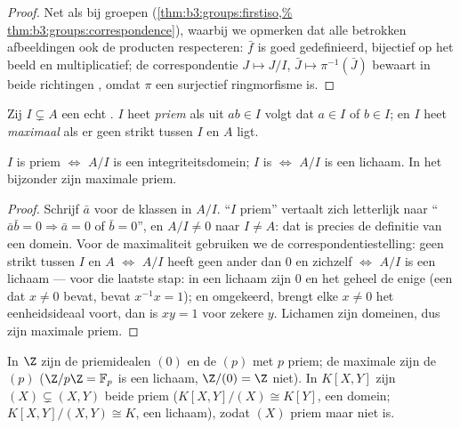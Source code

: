 \begin{proof}
Net als bij groepen (\cref{thm:b3:groups:firstiso,%
thm:b3:groups:correspondence}), waarbij we opmerken dat alle
betrokken afbeeldingen ook de producten respecteren: $\bar f$ is
goed gedefinieerd, bijectief op het beeld en multiplicatief; de
correspondentie $J \mapsto J/I$, $\bar J \mapsto \pi^{-1}(\bar J)$
bewaart in beide richtingen , omdat $\pi$ een surjectief
ringmorfisme is.
\end{proof}

\begin{definition}\label{def:b3:rings:primemaximal}
Zij $I \subsetneq A$ een echt . $I$ heet
\emph{priem} als uit $ab \in I$ volgt dat $a \in
I$ of $b \in I$; en $I$ heet \emph{maximaal} als er geen  strikt tussen $I$ en $A$ ligt.
\end{definition}

\begin{proposition}\label{prop:b3:rings:primemaximal}
$I$ is priem $\iff$ $A/I$ is een integriteitsdomein; $I$ is
 $\iff$ $A/I$ is een lichaam. In het bijzonder zijn
maximale  priem.
\end{proposition}

\begin{proof}
Schrijf $\bar a$ voor de klassen in $A/I$. ``$I$ priem'' vertaalt
zich letterlijk naar ``$\bar a\bar b = 0 \Rightarrow \bar a = 0$ of
$\bar b = 0$'', en $A/I \neq 0$ naar $I \neq A$: dat is precies de
definitie van een domein. Voor de maximaliteit gebruiken we de
correspondentiestelling: geen  strikt tussen $I$ en $A$
$\iff$ $A/I$ heeft geen ander  dan $0$ en zichzelf $\iff$
$A/I$ is een lichaam --- voor die laatste stap: in een lichaam zijn
$0$ en het geheel de enige  (een  dat $x \ne 0$ bevat,
bevat $x^{-1}x = 1$); en omgekeerd, brengt elke $x \neq 0$ het
eenheidsideaal voort, dan is $xy = 1$ voor zekere $y$. Lichamen
zijn domeinen, dus zijn maximale  priem.
\end{proof}

\begin{example}\label{ex:b3:rings:primemaximal}
In $\Z$ zijn de priemidealen $(0)$ en de $(p)$ met $p$ priem; de
maximale zijn de $(p)$ ($\Z/p\Z = \mathbb F_p$ is een lichaam,
$\Z/(0) = \Z$ niet). In $K[X, Y]$ zijn $(X) \subsetneq (X, Y)$
beide priem ($K[X,Y]/(X) \cong K[Y]$, een domein; $K[X,Y]/(X,Y)
\cong K$, een lichaam), zodat $(X)$ priem maar niet  is.
\end{example}

